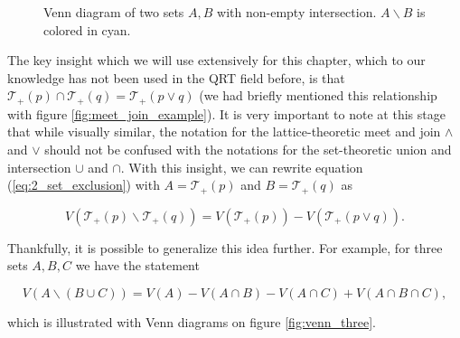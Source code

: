 \begin{figure}[h!] %
    \centering
    \caption{Venn diagram of two sets $A, B$ with non-empty intersection. $A \backslash B$ is colored in cyan.}
    \label{fig:venn_two}
\end{figure}

The key insight which we will use extensively for this chapter, which to our knowledge has not been used in the QRT field before, is that $\mathcal{T}_+(p) \cap \mathcal{T}_+(q) = \mathcal{T}_+(p \vee q)$ (we had briefly mentioned this relationship with figure \ref{fig:meet_join_example}). It is very important to note at this stage that while visually similar, the notation for the lattice-theoretic meet and join $\wedge$ and $\vee$ should not be confused with the notations for the set-theoretic union and intersection $\cup$ and $\cap$. With this insight, we can rewrite equation (\ref{eq:2_set_exclusion}) with $A = \mathcal{T}_+(p)$ and $B = \mathcal{T}_+(q)$ as

\begin{equation}
    V(\mathcal{T}_+(p) \backslash \mathcal{T}_+(q)) = V(\mathcal{T}_+(p)) - V(\mathcal{T}_+(p \vee q)).
\end{equation}

Thankfully, it is possible to generalize this idea further. For example, for three sets $A, B, C$ we have the statement

\begin{equation}
    V(A \backslash (B \cup C)) = V(A) - V(A \cap B) - V(A \cap C) + V(A \cap B \cap C),
\end{equation}

\noindent which is illustrated with Venn diagrams on figure \ref{fig:venn_three}.

